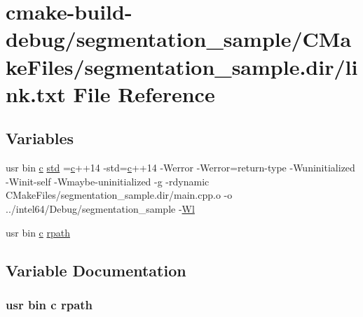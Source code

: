 \hypertarget{segmentation__sample_2CMakeFiles_2segmentation__sample_8dir_2link_8txt}{}\section{cmake-\/build-\/debug/segmentation\+\_\+sample/\+C\+Make\+Files/segmentation\+\_\+sample.dir/link.txt File Reference}
\label{segmentation__sample_2CMakeFiles_2segmentation__sample_8dir_2link_8txt}
\subsection*{Variables}
\begin{DoxyCompactItemize}
\item 
usr bin \hyperlink{CMakeCache_8txt_aac1d6a1710812201527c735f7c6afbaa}{c} \hyperlink{segmentation__sample_2CMakeFiles_2segmentation__sample_8dir_2link_8txt_a1ccfea5f558575a112db71eeb271fabf}{std} =\hyperlink{CMakeCache_8txt_aac1d6a1710812201527c735f7c6afbaa}{c}++14 -\/std=\hyperlink{CMakeCache_8txt_aac1d6a1710812201527c735f7c6afbaa}{c}++14 -\/Werror -\/Werror=return-\/type -\/Wuninitialized -\/Winit-\/self -\/Wmaybe-\/uninitialized -\/g -\/rdynamic C\+Make\+Files/segmentation\+\_\+sample.\+dir/main.\+cpp.\+o -\/o ../intel64/Debug/segmentation\+\_\+sample -\/\hyperlink{thirdparty_2extension_2CMakeFiles_2cpu__extension_8dir_2link_8txt_af9ccbf658ed2deb89d0d79f211e5b033}{Wl}
\item 
usr bin \hyperlink{CMakeCache_8txt_aac1d6a1710812201527c735f7c6afbaa}{c} \hyperlink{segmentation__sample_2CMakeFiles_2segmentation__sample_8dir_2link_8txt_ab9d7fd7120fafa2118a4e08c1df697c7}{rpath}
\end{DoxyCompactItemize}


\subsection{Variable Documentation}
\subsubsection[{\texorpdfstring{rpath}{rpath}}]{\setlength{\rightskip}{0pt plus 5cm}usr bin {\bf c} rpath}\hypertarget{segmentation__sample_2CMakeFiles_2segmentation__sample_8dir_2link_8txt_ab9d7fd7120fafa2118a4e08c1df697c7}{}\label{segmentation__sample_2CMakeFiles_2segmentation__sample_8dir_2link_8txt_ab9d7fd7120fafa2118a4e08c1df697c7}


